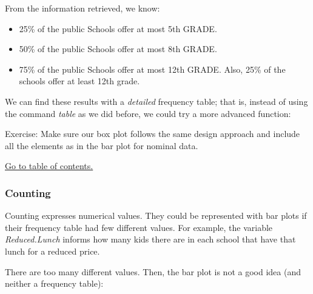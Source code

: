 \documentclass[]{article}
\newenvironment{Shaded}{\begin{snugshade}}{\end{snugshade}}
\newcommand{\KeywordTok}[1]{\textcolor[rgb]{0.13,0.29,0.53}{\textbf{#1}}}
\newcommand{\DataTypeTok}[1]{\textcolor[rgb]{0.13,0.29,0.53}{#1}}
\newcommand{\StringTok}[1]{\textcolor[rgb]{0.31,0.60,0.02}{#1}}
\newcommand{\CommentTok}[1]{\textcolor[rgb]{0.56,0.35,0.01}{\textit{#1}}}
\newcommand{\OperatorTok}[1]{\textcolor[rgb]{0.81,0.36,0.00}{\textbf{#1}}}
\newcommand{\NormalTok}[1]{#1}
\providecommand{\tightlist}{%
  \setlength{\itemsep}{0pt}\setlength{\parskip}{0pt}}
\begin{document}
From the information retrieved, we know:

\begin{itemize}
\tightlist
\item
  25\% of the public Schools offer at most 5th GRADE.
\item
  50\% of the public Schools offer at most 8th GRADE.
\item
  75\% of the public Schools offer at most 12th GRADE. Also, 25\% of the
  schools offer at least 12th grade.
\end{itemize}

We can find these results with a \emph{detailed} frequency table; that
is, instead of using the command \emph{table} as we did before, we could
try a more advanced function:

\begin{Shaded}
\end{Shaded}

{ Exercise: Make sure our box plot follows the same design approach and
include all the elements as in the bar plot for nominal data. }

\protect\hyperlink{part1}{Go to table of contents.}

\subsubsection{Counting}\label{counting}

Counting expresses numerical values. They could be represented with bar
plots if their frequency table had few different values. For example,
the variable \emph{Reduced.Lunch} informs how many kids there are in
each school that have that lunch for a reduced price.

\begin{Shaded}
\end{Shaded}

There are too many different values. Then, the bar plot is not a good
idea (and neither a frequency table):
\end{document}
